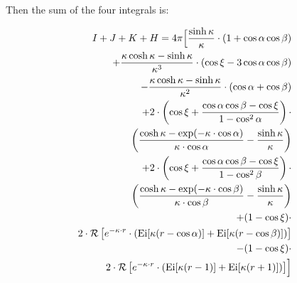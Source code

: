 Then the sum of the four integrals is:

\begin{equation}\begin{aligned}
I + J + K + H = 4 \pi \Bigl[\frac{\sinh\kappa}{\kappa} \cdot (1 + \cos \alpha \cos \beta) \\ + \frac{\kappa \cosh \kappa - \sinh \kappa}{\kappa^3} \cdot (\cos \xi - 3 \cos \alpha \cos \beta) \\ - \frac{\kappa \cosh \kappa - \sinh \kappa}{\kappa^2} \cdot (\cos \alpha + \cos \beta) \\ +  2 \cdot \left(\cos \xi + \frac{\cos \alpha \cos \beta - \cos \xi}{1 - \cos^2 \alpha}\right) \cdot \\ \left(\frac{\cosh \kappa - \exp(-\kappa \cdot \cos \alpha)}{\kappa \cdot \cos \alpha} - \frac{\sinh \kappa}{\kappa} \right) \\ +  2 \cdot \left(\cos \xi + \frac{\cos \alpha \cos \beta - \cos \xi}{1 - \cos^2 \beta}\right) \cdot \\ \left(\frac{\cosh \kappa - \exp(-\kappa \cdot \cos \beta)}{\kappa \cdot \cos \beta} - \frac{\sinh \kappa}{\kappa} \right) \\ + (1 - \cos \xi) \cdot \\  2 \cdot \mathcal{R} \left[ e^{-\kappa \cdot r} \cdot \left(\text{Ei} [\kappa(r - \cos \alpha)] + \text{Ei}[\kappa(r - \cos \beta)] \right) \right] \\ - (1 - \cos \xi) \cdot \\ 2 \cdot \mathcal{R} \left[ e^{-\kappa \cdot r} \cdot \left(\text{Ei} [\kappa(r - 1)] + \text{Ei}[\kappa(r + 1)] \right) \right]\Bigr]
\end{aligned}\end{equation}

